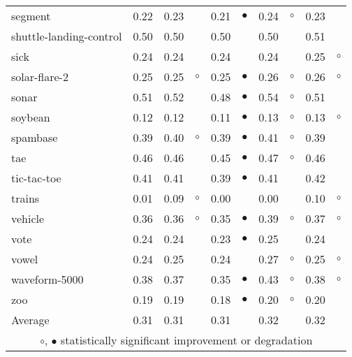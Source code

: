 {\begin{longtable}{lrr@{\hspace{0.1cm}}cr@{\hspace{0.1cm}}cr@{\hspace{0.1cm}}cr@{\hspace{0.1cm}}c}
segment & 0.22 & 0.23 &           & 0.21 & $\bullet$ & 0.24 &   $\circ$ & 0.23 &          \\
shuttle-landing-control & 0.50 & 0.50 &           & 0.50 &           & 0.50 &           & 0.51 &          \\
sick & 0.24 & 0.24 &           & 0.24 &           & 0.24 &           & 0.25 &   $\circ$\\
solar-flare-2 & 0.25 & 0.25 &   $\circ$ & 0.25 & $\bullet$ & 0.26 &   $\circ$ & 0.26 &   $\circ$\\
sonar & 0.51 & 0.52 &           & 0.48 & $\bullet$ & 0.54 &   $\circ$ & 0.51 &          \\
soybean & 0.12 & 0.12 &           & 0.11 & $\bullet$ & 0.13 &   $\circ$ & 0.13 &   $\circ$\\
spambase & 0.39 & 0.40 &   $\circ$ & 0.39 & $\bullet$ & 0.41 &   $\circ$ & 0.39 &          \\
tae & 0.46 & 0.46 &           & 0.45 & $\bullet$ & 0.47 &   $\circ$ & 0.46 &          \\
tic-tac-toe & 0.41 & 0.41 &           & 0.39 & $\bullet$ & 0.41 &           & 0.42 &          \\
trains & 0.01 & 0.09 &   $\circ$ & 0.00 &           & 0.00 &           & 0.10 &   $\circ$\\
vehicle & 0.36 & 0.36 &   $\circ$ & 0.35 & $\bullet$ & 0.39 &   $\circ$ & 0.37 &   $\circ$\\
vote & 0.24 & 0.24 &           & 0.23 & $\bullet$ & 0.25 &           & 0.24 &          \\
vowel & 0.24 & 0.25 &           & 0.24 &           & 0.27 &   $\circ$ & 0.25 &   $\circ$\\
waveform-5000 & 0.38 & 0.37 &           & 0.35 & $\bullet$ & 0.43 &   $\circ$ & 0.38 &   $\circ$\\
zoo & 0.19 & 0.19 &           & 0.18 & $\bullet$ & 0.20 &   $\circ$ & 0.20 &          \\
\hline
Average & 0.31 & 0.31 &           & 0.31 &           & 0.32 &           & 0.32 &          \\
\hline
\multicolumn{10}{c}{$\circ$, $\bullet$ statistically significant improvement or degradation}\\
\end{longtable} \footnotesize \par}

